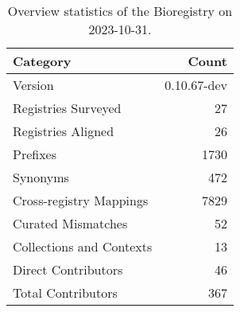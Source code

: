 \begin{table}
\caption{Overview statistics of the Bioregistry on 2023-10-31.}
\label{tab:bioregistry-summary}
\begin{tabular}{lr}
\toprule
Category & Count \\
\midrule
Version & 0.10.67-dev \\
Registries Surveyed & 27 \\
Registries Aligned & 26 \\
Prefixes & 1730 \\
Synonyms & 472 \\
Cross-registry Mappings & 7829 \\
Curated Mismatches & 52 \\
Collections and Contexts & 13 \\
Direct Contributors & 46 \\
Total Contributors & 367 \\
\bottomrule
\end{tabular}
\end{table}
